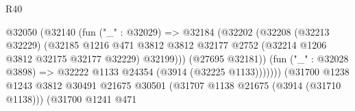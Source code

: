 \begin{lexlean}{R40}
\begin{coremodule}
                                                      @32050
                                                        (@32140
                                                          (fun ("_" : @32029) =>
                                                          @32184
                                                            (@32202
                                                              (@32208
                                                                (@32213 @32229)
                                                                (@32185
                                                                  @1216
                                                                  @471
                                                                  @3812
                                                                  @3812
                                                                  @32177
                                                                  @2752
                                                                  (@32214
                                                                    @1206
                                                                    @3812
                                                                    @32175
                                                                    @32177
                                                                    @32229)
                                                                  @32199)))
                                                            (@27695 @32181))
                                                          (fun ("_" : @32028 @3898) =>
                                                          @32222
                                                            @1133
                                                            @24354
                                                            (@3914 (@32225 @1133)))))))
                                                  (@31700
                                                    @1238
                                                    @1243
                                                    @3812
                                                    @30491
                                                    @21675
                                                    @30501
                                                    (@31707 @1138 @21675 (@3914 (@31710 @1138)))
                                                    (@31700
                                                      @1241
                                                      @471

\end{coremodule}
\end{lexlean}
